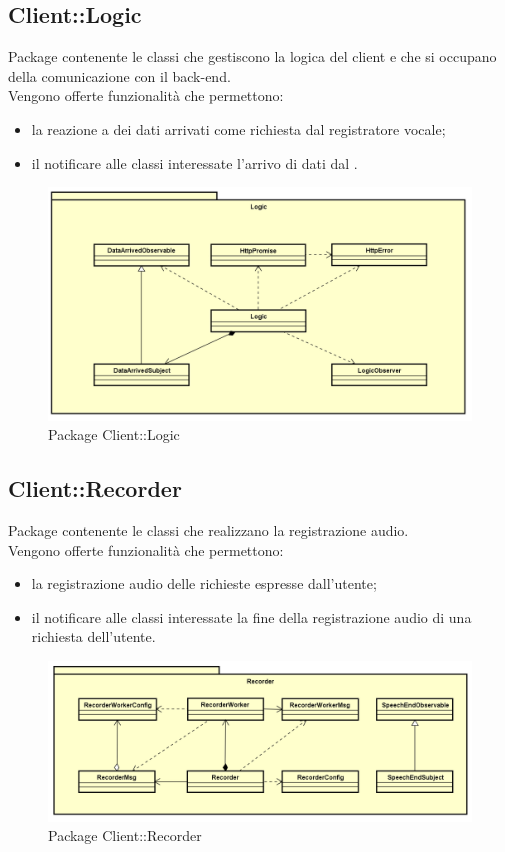 \subsection{Client::Logic}
Package contenente le classi che gestiscono la logica del client e che si occupano della comunicazione con il back-end.\\ Vengono offerte funzionalità che permettono: \begin{itemize} \item la reazione a dei dati arrivati come richiesta dal registratore vocale; \item il notificare alle classi interessate l'arrivo di dati dal . \end{itemize}
\begin{figure}[h] \centering \includegraphics[width=\textwidth,height=\textheight,keepaspectratio]{images/diagrams/client/Client/Logic.png}
\caption{Package Client::Logic}
\end{figure}
\newpage


\subsection{Client::Recorder}
Package contenente le classi che realizzano la registrazione audio.\\ Vengono offerte funzionalità che permettono: \begin{itemize} \item la registrazione audio delle richieste espresse dall'utente; \item il notificare alle classi interessate la fine della registrazione audio di una richiesta dell'utente. \end{itemize}
\begin{figure}[h] \centering \includegraphics[width=\textwidth,height=\textheight,keepaspectratio]{images/diagrams/client/Client/Recorder.png}
\caption{Package Client::Recorder}
\end{figure}
\newpage


